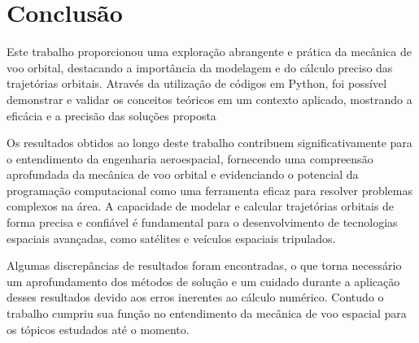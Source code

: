 \chapter{Conclusão}

\par Este trabalho proporcionou uma exploração abrangente e prática da mecânica de voo orbital, destacando a importância da modelagem e do cálculo preciso das trajetórias orbitais. Através da utilização de códigos em Python, foi possível demonstrar e validar os conceitos teóricos em um contexto aplicado, mostrando a eficácia e a precisão das soluções proposta
\par Os resultados obtidos ao longo deste trabalho contribuem significativamente para o entendimento da engenharia aeroespacial, fornecendo uma compreensão aprofundada da mecânica de voo orbital e evidenciando o potencial da programação computacional como uma ferramenta eficaz para resolver problemas complexos na área. A capacidade de modelar e calcular trajetórias orbitais de forma precisa e confiável é fundamental para o desenvolvimento de tecnologias espaciais avançadas, como satélites e veículos espaciais tripulados.
\par Algumas discrepâncias de resultados foram encontradas, o que torna necessário um aprofundamento dos métodos de solução e um cuidado durante a aplicação desses resultados devido aos erros inerentes ao cálculo numérico. Contudo o trabalho cumpriu sua função no entendimento da mecânica de voo espacial para os tópicos estudados até o momento.